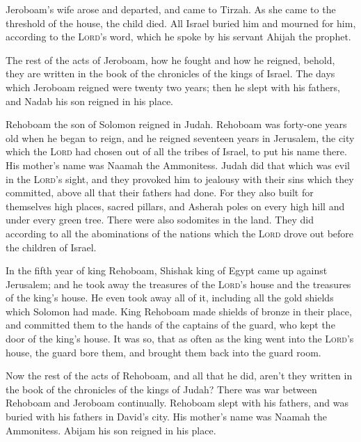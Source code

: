  Jeroboam's wife arose and departed, and came to Tirzah.
As she came to the threshold of the house, the child died.
 All Israel buried him and mourned for him, according to
the \textsc{Lord}'s word, which he spoke by his servant Ahijah the
prophet.

 The rest of the acts of Jeroboam, how he fought and how
he reigned, behold, they are written in the book of the chronicles of
the kings of Israel.  The days which Jeroboam reigned
were twenty two years; then he slept with his fathers, and Nadab his son
reigned in his place.

 Rehoboam the son of Solomon reigned in Judah. Rehoboam
was forty-one years old when he began to reign, and he reigned seventeen
years in Jerusalem, the city which the \textsc{Lord} had chosen out of
all the tribes of Israel, to put his name there. His mother's name was
Naamah the Ammonitess.  Judah did that which was evil in
the \textsc{Lord}'s sight, and they provoked him to jealousy with their
sins which they committed, above all that their fathers had done.
 For they also built for themselves high places, sacred
pillars, and Asherah poles on every high hill and under every green
tree.  There were also sodomites in the land. They did
according to all the abominations of the nations which the \textsc{Lord}
drove out before the children of Israel.

 In the fifth year of king Rehoboam, Shishak king of
Egypt came up against Jerusalem;  and he took away the
treasures of the \textsc{Lord}'s house and the treasures of the king's
house. He even took away all of it, including all the gold shields which
Solomon had made.  King Rehoboam made shields of bronze
in their place, and committed them to the hands of the captains of the
guard, who kept the door of the king's house.  It was so,
that as often as the king went into the \textsc{Lord}'s house, the guard
bore them, and brought them back into the guard room.

 Now the rest of the acts of Rehoboam, and all that he
did, aren't they written in the book of the chronicles of the kings of
Judah?  There was war between Rehoboam and Jeroboam
continually.  Rehoboam slept with his fathers, and was
buried with his fathers in David's city. His mother's name was Naamah
the Ammonitess. Abijam his son reigned in his place.

